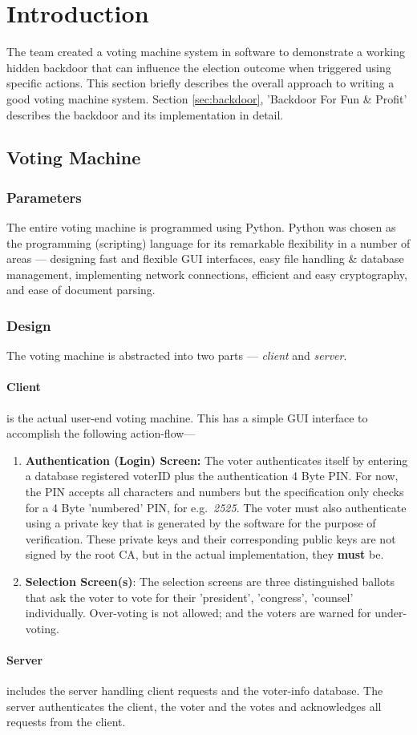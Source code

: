 \section{Introduction}
\label{sec:intro}

The team created a voting machine system in software to demonstrate a working hidden backdoor that can influence the election outcome when triggered using specific actions. This section briefly describes the overall approach to writing a good voting machine system. Section \ref{sec:backdoor}, 'Backdoor For Fun \& Profit' describes the backdoor and its implementation in detail.

\subsection{Voting Machine}

\subsubsection{Parameters}
The entire voting machine is programmed using Python. Python was chosen as the programming (scripting) language for its remarkable flexibility in a number of areas --- designing fast and flexible GUI interfaces, easy file handling \& database management, implementing network connections, efficient and easy cryptography, and ease of document parsing.

\subsubsection{Design}
The voting machine is abstracted into two parts --- \emph{client} and \emph{server}.

\paragraph{Client} is the actual user-end voting machine. This has a simple GUI interface to accomplish the following action-flow---

\begin{enumerate}
	\item \textbf{Authentication (Login) Screen:} The voter authenticates itself by entering a database registered voterID plus the authentication 4 Byte PIN. For now, the PIN accepts all characters and numbers but the specification only checks for a 4 Byte 'numbered' PIN, for e.g.\ \emph{2525}. The voter must also authenticate using a private key that is generated by the software for the purpose of verification. These private keys and their corresponding public keys are not signed by the root CA, but in the actual implementation, they \textbf{must} be.
	\item \textbf{Selection Screen(s)}: The selection screens are three distinguished ballots that ask the voter to vote for their 'president', 'congress', 'counsel' individually. Over-voting is not allowed; and the voters are warned for under-voting.
\end{enumerate}
	
\paragraph{Server} includes the server handling client requests and the voter-info database. The server authenticates the client, the voter and the votes and acknowledges all requests from the client.